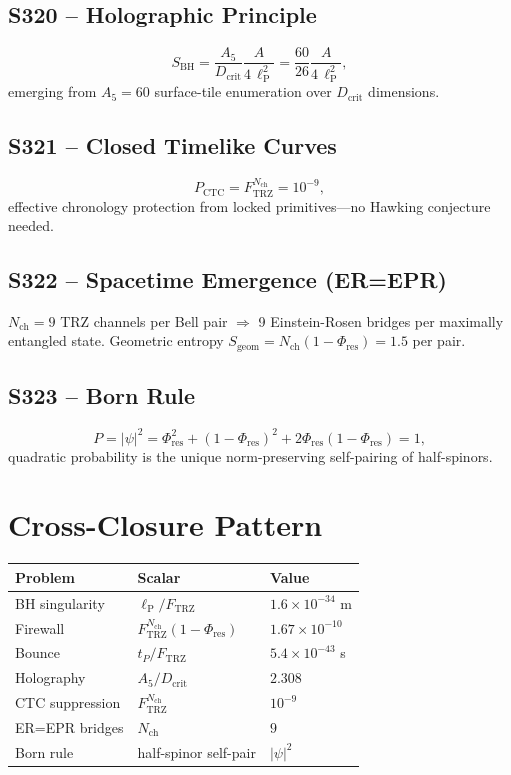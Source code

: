 \documentclass[11pt]{article}
\newcommand{\Ftrz}{F_{\mathrm{TRZ}}}
\newcommand{\Phires}{\Phi_{\mathrm{res}}}
\newcommand{\Dcrit}{D_{\mathrm{crit}}}
\newcommand{\Nch}{N_{\mathrm{ch}}}
\newcommand{\ellP}{\ell_{\mathrm{P}}}
\begin{document}
\subsection{S320 -- Holographic Principle}
\begin{equation}
S_{\text{BH}}=\frac{A_5}{\Dcrit}\frac{A}{4\,\ellP^2}=\frac{60}{26}\frac{A}{4\,\ellP^2},
\end{equation}
emerging from $A_5=60$ surface-tile enumeration over $\Dcrit$ dimensions.

\subsection{S321 -- Closed Timelike Curves}
\begin{equation}
P_{\text{CTC}}=\Ftrz^{\Nch}=10^{-9},
\end{equation}
effective chronology protection from locked primitives---no Hawking conjecture needed.

\subsection{S322 -- Spacetime Emergence (ER=EPR)}
$\Nch=9$ TRZ channels per Bell pair $\Rightarrow$ 9 Einstein-Rosen bridges per maximally entangled state. Geometric entropy $S_{\text{geom}}=\Nch(1-\Phires)=1.5$ per pair.

\subsection{S323 -- Born Rule}
\begin{equation}
P=|\psi|^2=\Phires^2+(1-\Phires)^2+2\Phires(1-\Phires)=1,
\end{equation}
quadratic probability is the unique norm-preserving self-pairing of half-spinors.

\section{Cross-Closure Pattern}
\begin{table}[h!]
\centering
\begin{tabular}{lll}
\toprule
Problem & Scalar & Value \\
\midrule
BH singularity         & $\ellP/\Ftrz$              & $1.6\times10^{-34}$ m \\
Firewall               & $\Ftrz^{\Nch}(1-\Phires)$  & $1.67\times10^{-10}$ \\
Bounce                 & $t_P/\Ftrz$                & $5.4\times10^{-43}$ s \\
Holography             & $A_5/\Dcrit$               & $2.308$ \\
CTC suppression        & $\Ftrz^{\Nch}$             & $10^{-9}$ \\
ER=EPR bridges         & $\Nch$                     & $9$ \\
Born rule              & half-spinor self-pair      & $|\psi|^2$ \\
\bottomrule
\end{tabular}
\end{table}
\end{document}
